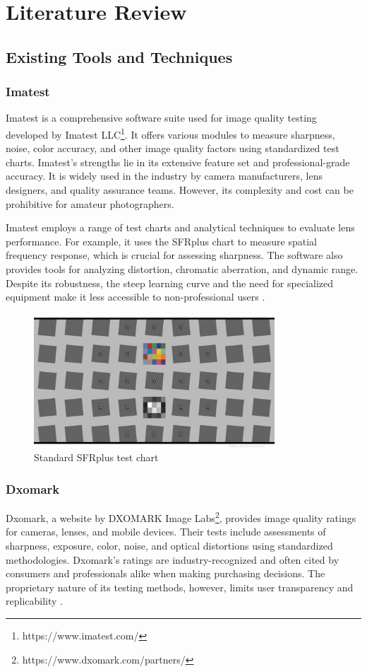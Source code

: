 \chapter{Literature Review}
\section{Existing Tools and Techniques}

\subsection{Imatest}
Imatest is a comprehensive software suite used for image quality testing developed by Imatest LLC\footnote[1]{https://www.imatest.com/}. It offers various modules to measure sharpness, noise, color accuracy, and other image quality factors using standardized test charts. Imatest's strengths lie in its extensive feature set and professional-grade accuracy. It is widely used in the industry by camera manufacturers, lens designers, and quality assurance teams. However, its complexity and cost can be prohibitive for amateur photographers.

Imatest employs a range of test charts and analytical techniques to evaluate lens performance. For example, it uses the SFRplus chart to measure spatial frequency response, which is crucial for assessing sharpness. The software also provides tools for analyzing distortion, chromatic aberration, and dynamic range. Despite its robustness, the steep learning curve and the need for specialized equipment make it less accessible to non-professional users \cite[]{ImatestAbout}.

\begin{figure}[h]
\centering
\includegraphics[height=5cm]{Images/SFRplus_chart.jpg}
\caption{Standard SFRplus test chart \cite{ImatestSFRChart}}
\label{fig:psf}
\end{figure}

\subsection{Dxomark}
Dxomark, a website by DXOMARK Image Labs\footnote[1]{https://www.dxomark.com/partners/}, provides image quality ratings for cameras, lenses, and mobile devices. Their tests include assessments of sharpness, exposure, color, noise, and optical distortions using standardized methodologies. Dxomark's ratings are industry-recognized and often cited by consumers and professionals alike when making purchasing decisions. The proprietary nature of its testing methods, however, limits user transparency and replicability \cite{DxomarkTestingLenses}.

